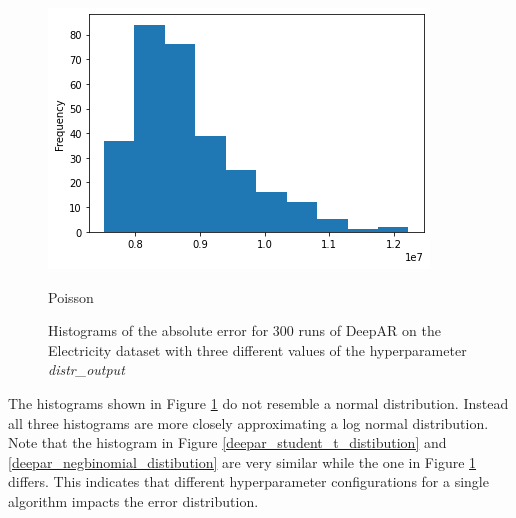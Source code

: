 \begin{figure}[htb]
    \includegraphics[width=\linewidth]{./img/histogram_deepar_poisson_electricity_statistics_200_samples.png}
    \caption{Poisson}
    \label{deepar_poisson_distribution}
    \endminipage
    \caption{Histograms of the absolute error for 300 runs of DeepAR on the Electricity dataset with three different values of the hyperparameter \emph{distr\_output}}
    \label{deepar_elec_300_hist}
\end{figure}


The histograms shown in Figure \ref{deepar_elec_300_hist} do not resemble a normal distribution. Instead all three histograms are more closely approximating a log normal distribution. Note that the histogram in Figure \ref{deepar_student_t_distibution} and \ref{deepar_negbinomial_distibution} are very similar while the one in Figure \ref{deepar_elec_300_hist} differs. This indicates that different hyperparameter configurations for a single algorithm impacts the error distribution.


